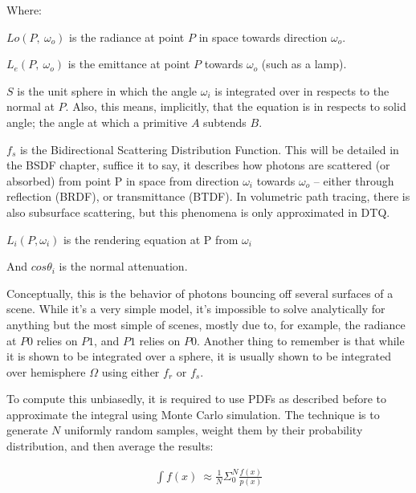 \message{ !name(test.tex)}\documentclass{article}
\begin{document}
  Where:
  \begin{list}{}{}
  	 \item $Lo(P,\:\omega_o)$ is the radiance at point $P$ in space towards direction $\omega_o$. 
  	 
  	 \item $L_e(P,\:\omega_o)$ is the emittance at point $P$ towards $\omega_o$
      (such as a lamp).
  	 
  	 
  	 \item $S$ is the unit sphere in which the angle $\omega_i$ is integrated
        over in respects to the normal at $P$. Also, this means, implicitly,
        that the equation is in respects to solid angle; the angle at which a
        primitive $A$ subtends $B$.
  	 
  	 \item $f_s$ is the Bidirectional Scattering Distribution Function. This
        will be detailed in the BSDF chapter, suffice it to say, it describes
        how photons are scattered (or absorbed) from point P in space from
        direction $\omega_i$ towards $\omega_o$ -- either through reflection
        (BRDF), or transmittance (BTDF). In volumetric path tracing, there is
        also subsurface scattering, but this phenomena is only approximated in
        DTQ.
  	 
  	 \item $L_i(P, \omega_i)$ is the rendering equation at P from $\omega_i$
  	 
  	 \item And $cos\theta_i$ is the normal attenuation.
  \end{list}
  Conceptually, this is the behavior of photons bouncing off several surfaces of
a scene. While it's a very simple model, it's impossible to solve analytically
for anything but the most simple of scenes, mostly due to, for example, the
radiance at $P0$ relies on $P1$, and $P1$ relies on $P0$. Another thing to
remember is that while it is shown to be integrated over a sphere, it is usually
shown to be integrated over hemisphere $\Omega$ using either $f_r$ or $f_s$.
  
  To compute this unbiasedly, it is required to use PDFs as described before to
approximate the integral using Monte Carlo simulation. The technique is to
generate $N$ uniformly random samples, weight them by their probability
distribution, and then average the results:
  
  \begin{align}
   \int{f(x)} \: \approx \frac{1}{N}\Sigma_0^N{\frac{f(x)}{p(x)}}
  \end{align}
  
\end{document}
